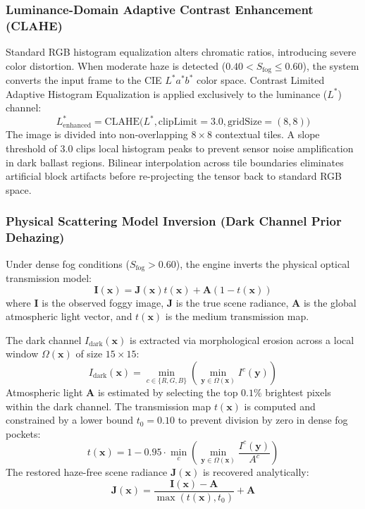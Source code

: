 \documentclass[conference]{IEEEtran}
\begin{document}
\subsubsection{Luminance-Domain Adaptive Contrast Enhancement (CLAHE)}
Standard RGB histogram equalization alters chromatic ratios, introducing severe color distortion. When moderate haze is detected ($0.40 < S_{\text{fog}} \le 0.60$), the system converts the input frame to the CIE $L^*a^*b^*$ color space. Contrast Limited Adaptive Histogram Equalization is applied exclusively to the luminance ($L^*$) channel:
\begin{equation}
L^*_{\text{enhanced}} = \text{CLAHE}\big(L^*, \text{clipLimit}=3.0, \text{gridSize}=(8,8)\big)
\end{equation}
The image is divided into non-overlapping $8\times8$ contextual tiles. A slope threshold of $3.0$ clips local histogram peaks to prevent sensor noise amplification in dark ballast regions. Bilinear interpolation across tile boundaries eliminates artificial block artifacts before re-projecting the tensor back to standard RGB space.

\subsubsection{Physical Scattering Model Inversion (Dark Channel Prior Dehazing)}
Under dense fog conditions ($S_{\text{fog}} > 0.60$), the engine inverts the physical optical transmission model:
\begin{equation}
\mathbf{I}(\mathbf{x}) = \mathbf{J}(\mathbf{x}) t(\mathbf{x}) + \mathbf{A} (1 - t(\mathbf{x}))
\end{equation}
where $\mathbf{I}$ is the observed foggy image, $\mathbf{J}$ is the true scene radiance, $\mathbf{A}$ is the global atmospheric light vector, and $t(\mathbf{x})$ is the medium transmission map. 

The dark channel $I_{\text{dark}}(\mathbf{x})$ is extracted via morphological erosion across a local window $\Omega(\mathbf{x})$ of size $15\times15$:
\begin{equation}
I_{\text{dark}}(\mathbf{x}) = \min_{c \in \{R,G,B\}} \left( \min_{\mathbf{y} \in \Omega(\mathbf{x})} I^c(\mathbf{y}) \right)
\end{equation}
Atmospheric light $\mathbf{A}$ is estimated by selecting the top $0.1\%$ brightest pixels within the dark channel. The transmission map $t(\mathbf{x})$ is computed and constrained by a lower bound $t_0 = 0.10$ to prevent division by zero in dense fog pockets:
\begin{equation}
t(\mathbf{x}) = 1 - 0.95 \cdot \min_{c} \left( \min_{\mathbf{y} \in \Omega(\mathbf{x})} \frac{I^c(\mathbf{y})}{A^c} \right)
\end{equation}
The restored haze-free scene radiance $\mathbf{J}(\mathbf{x})$ is recovered analytically:
\begin{equation}
\mathbf{J}(\mathbf{x}) = \frac{\mathbf{I}(\mathbf{x}) - \mathbf{A}}{\max(t(\mathbf{x}), t_0)} + \mathbf{A}
\end{equation}
\end{document}
